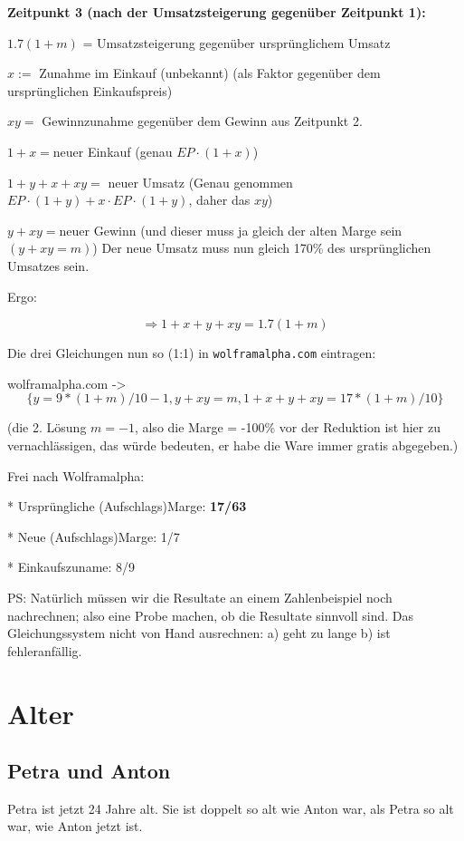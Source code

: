 {\textbf{Zeitpunkt 3 (nach der Umsatzsteigerung gegenüber Zeitpunkt 1):}

$1.7(1+m)$ = Umsatzsteigerung gegenüber ursprünglichem Umsatz


$x :=$ Zunahme im Einkauf (unbekannt) (als Faktor gegenüber dem ursprünglichen Einkaufspreis)

$xy =$ Gewinnzunahme gegenüber dem Gewinn aus Zeitpunkt 2.

$1+x = $neuer Einkauf (genau $EP \cdot{} (1+x)$)

$1+y + x + xy =$ neuer Umsatz (Genau genommen $EP \cdot{} (1+y) + x\cdot{}EP \cdot{}(1+y)$,
daher das $xy$)

$y+xy = $neuer Gewinn (und dieser muss ja gleich der alten Marge sein $(y+xy=m)$)
Der neue Umsatz muss nun gleich 170\% des ursprünglichen Umsatzes sein.

Ergo:

$$\Longrightarrow 1+x+y+xy = 1.7(1+m)$$

Die drei Gleichungen nun so (1:1) in \texttt{wolframalpha.com} eintragen:

wolframalpha.com -> $$\{ y=9*(1+m)/10-1, y+xy=m, 1+x+y+xy=17*(1+m)/10\}$$

(die 2. Lösung $m=-1$, also die Marge = -100\% vor der Reduktion ist hier zu
vernachlässigen, das würde bedeuten, er habe die Ware immer gratis
abgegeben.)

Frei nach Wolframalpha:

* Ursprüngliche (Aufschlags)Marge: \textbf{17/63}

* Neue (Aufschlags)Marge: 1/7

* Einkaufszuname: 8/9

PS: Natürlich müssen wir die Resultate an einem Zahlenbeispiel noch
nachrechnen; also eine Probe machen, ob die Resultate sinnvoll sind.
Das Gleichungssystem nicht von Hand ausrechnen: a) geht zu lange b) ist
fehleranfällig.
\newpage
}%


\section{Alter}
\subsection{Petra und Anton}

Petra ist jetzt 24 Jahre alt. Sie ist doppelt so alt wie Anton war, als Petra so alt
war, wie Anton jetzt ist.

